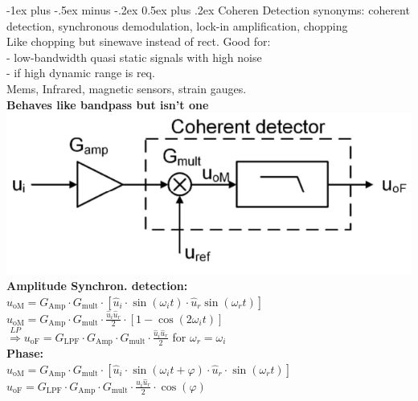 \documentclass[5pt]{article}
\makeatletter
\renewcommand{\section}{\@startsection{section}{1}{0mm}%
                                {-1ex plus -.5ex minus -.2ex}%
                                {0.5ex plus .2ex}%
                                {\normalfont\large\bfseries}}
\makeatother
\begin{document}
\begin{multicols*}{4}
\section{Coheren Detection}
synonyms: coherent detection, synchronous demodulation, lock-in amplification, chopping\\
Like chopping but sinewave instead of rect.
Good for:\\
- low-bandwidth quasi static signals with high noise\\
- if high dynamic range is req.\\
Mems, Infrared, magnetic sensors, strain gauges. \\
\textbf{Behaves like bandpass but isn't one}\\
\includegraphics[width=\columnwidth]{images/coherent_setup.png}\\
\textbf{Amplitude Synchron. detection:}\\
$ u_{\mathrm{oM}}=G_{\mathrm{Amp}} \cdot G_{\mathrm{mult}} \cdot\left[\hat{u}_{i} \cdot \sin \left(\omega_{i} t\right) \cdot \hat{u}_{r} \sin \left(\omega_{r} t\right)\right] $\\
$ u_{\mathrm{oM}}=G_{\mathrm{Amp}} \cdot G_{\mathrm{mult}} \cdot \frac{\widehat{u}_{i} \widehat{u}_{r}}{2} \cdot\left[1-\cos \left(2 \omega_{i} t\right)\right] $\\
$ \overset{LP}{\Rightarrow} u_{\mathrm{oF}}=G_{\mathrm{LPF}} \cdot G_{\mathrm{Amp}} \cdot G_{\mathrm{mult}} \cdot \frac{\hat{u}_{i} \hat{u}_{r}}{2} $
for $ \omega_r = \omega_i $\\
\textbf{Phase:}\\
$ u_{\mathrm{oM}}=G_{\mathrm{Amp}} \cdot G_{\mathrm{mult}} \cdot\left[\hat{u}_{i} \cdot \sin \left(\omega_{i} t+\varphi\right) \cdot \hat{u}_{r} \cdot \sin \left(\omega_{r} t\right)\right] $\\
$ u_{\mathrm{oF}}=G_{\mathrm{LPF}} \cdot G_{\mathrm{Amp}} \cdot G_{\mathrm{mult}} \cdot \frac{\widehat{u}_{i} \widehat{u}_{r}}{2} \cdot \cos (\varphi) $\\

\end{multicols*}
\end{document}
